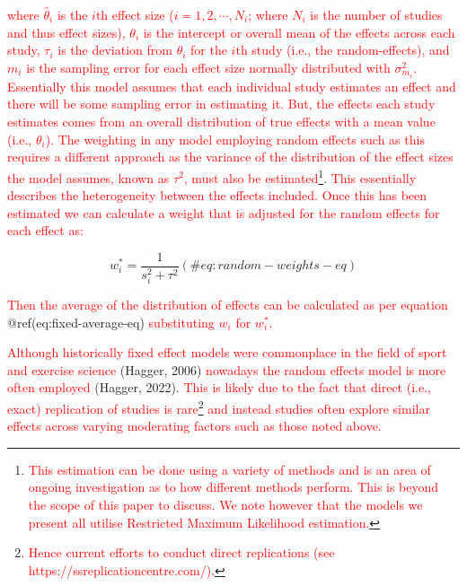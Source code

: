 \documentclass[
]{article}
\begin{document}
\textcolor{red}{where $\hat\theta_{i}$ is the $i\textrm{th}$ effect size ($i = 1,2,\cdots,N_{i}$; where $N_{i}$ is the number of studies and thus effect sizes), $\theta_i$ is the intercept or overall mean of the effects across each study, $\tau_{i}$ is the deviation from $\theta_{i}$ for the $i\textrm{th}$ study (i.e., the random-effects), and $m_{i}$ is the sampling error for each effect size normally distributed with $\sigma^2_{m_{i}}$. Essentially this model assumes that each individual study estimates an effect and there will be some sampling error in estimating it. But, the effects each study estimates comes from an overall distribution of true effects with a mean value (i.e., $\theta_{i}$). The weighting in any model employing random effects such as this requires a different approach as the variance of the distribution of the effect sizes the model assumes, known as $\tau^2$, must also be estimated}\footnote{\textcolor{red}{This estimation can be done using a variety of methods and is an area of ongoing investigation as to how different methods perform. This is beyond the scope of this paper to discuss. We note however that the models we present all utilise Restricted Maximum Likelihood estimation.}}. \textcolor{red}{This essentially describes the heterogeneity between the effects included. Once this has been estimated we can calculate a weight that is adjusted for the random effects for each effect as:}

\begin{equation}
w^*_{i}=\frac{1}{s^2_{i}+\tau^2}
(\#eq:random-weights-eq)
\end{equation}

\textcolor{red}{Then the average of the distribution of effects can be calculated as per equation} @ref(eq:fixed-average-eq) \textcolor{red}{substituting $w_{i}$ for $w^*_{i}$.}

\textcolor{red}{Although historically fixed effect models were commonplace in the field of sport and exercise science} (Hagger, 2006) \textcolor{red}{nowadays the random effects model is more often employed} (Hagger, 2022). \textcolor{red}{This is likely due to the fact that direct (i.e., exact) replication of studies is rare}\footnote{\textcolor{red}{Hence current efforts to conduct direct replications (see https://ssreplicationcentre.com/).}} \textcolor{red}{and instead studies often explore similar effects across varying moderating factors such as those noted above.}
\end{document}
